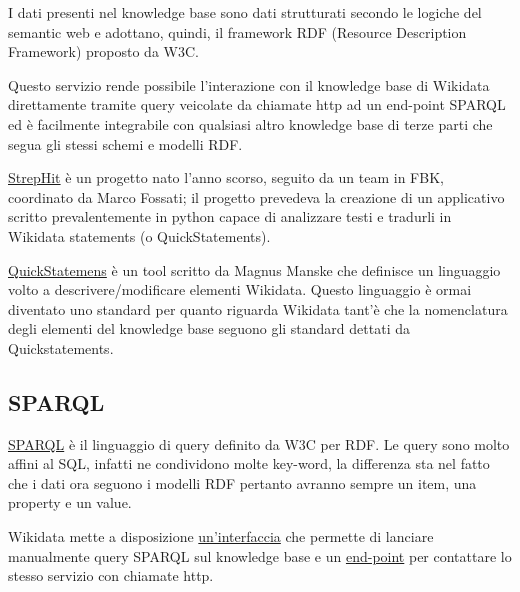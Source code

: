 I dati presenti nel knowledge base sono dati strutturati secondo le logiche del semantic web e adottano, quindi, il framework RDF (Resource Description Framework) proposto da W3C. 

Questo servizio rende possibile l'interazione con il knowledge base di Wikidata direttamente tramite query veicolate da chiamate http ad un end-point SPARQL ed è facilmente integrabile 
con qualsiasi altro knowledge base di terze parti che segua gli stessi schemi e modelli RDF.

\href{https://www.mediawiki.org/wiki/StrepHit}{StrepHit} è un progetto nato l'anno scorso, seguito da un team in FBK, coordinato da Marco Fossati; il progetto prevedeva la creazione di un applicativo scritto prevalentemente 
in python capace di analizzare testi e tradurli in Wikidata statements (o QuickStatements).  

\href{https://www.mediawiki.org/wiki/StrepHit}{QuickStatemens} è un tool scritto da Magnus Manske che definisce un linguaggio volto a descrivere/modificare elementi Wikidata. Questo linguaggio è ormai diventato uno standard 
per quanto riguarda Wikidata tant'è che la nomenclatura degli elementi del knowledge base seguono gli standard dettati da Quickstatements.

\subsection{SPARQL}
\href{https://www.w3.org/TR/sparql11-query/}{SPARQL} è il linguaggio di query definito da W3C per RDF. Le query sono molto affini al SQL, infatti ne condividono molte key-word, la differenza sta nel fatto che i dati ora 
seguono i modelli RDF pertanto avranno sempre un item, una property e un value.

Wikidata mette a disposizione \href{https://query.wikidata.org/}{un'interfaccia} che permette di lanciare manualmente query SPARQL sul knowledge base
e un \href{https://query.wikidata.org/bigdata/namespace/wdq/sparql?query={SPARQL}}{end-point} per contattare lo stesso servizio con chiamate http. 

